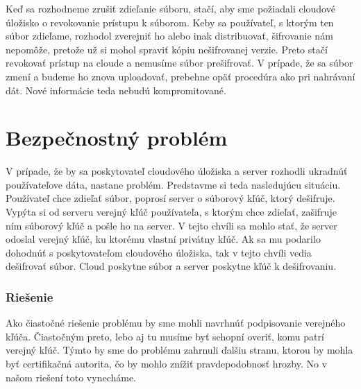 		Keď sa rozhodneme zrušiť zdieľanie súboru, stačí, aby sme požiadali cloudové úložisko o revokovanie prístupu k súborom. Keby sa používateľ, s ktorým ten súbor zdieľame, rozhodol zverejniť ho alebo inak distribuovať, šifrovanie nám nepomôže, pretože už si mohol spraviť kópiu nešifrovanej verzie. Preto stačí revokovať prístup na cloude a nemusíme súbor prešifrovať. V prípade, že sa súbor zmení a budeme ho znova uploadovať, prebehne opäť procedúra ako pri nahrávaní dát. Nové informácie teda nebudú kompromitované.
		
		
	\section{Bezpečnostný problém}
	
		V prípade, že by sa poskytovateľ cloudového úložiska a server rozhodli ukradnúť používateľove dáta, nastane problém. Predstavme si teda nasledujúcu situáciu. Používateľ chce zdieľať súbor, poprosí server o súborový kľúč, ktorý dešifruje. Vypýta si od serveru verejný kľúč používateľa, s ktorým chce zdieľať, zašifruje ním súborový kľúč a pošle ho na server. V tejto chvíli sa mohlo stať, že server odoslal verejný kľúč, ku ktorému vlastní privátny kľúč. Ak sa mu podarilo dohodnúť s poskytovateľom cloudového úložiska, tak v tejto chvíli vedia dešifrovať súbor. Cloud poskytne súbor a server poskytne kľúč k dešifrovaniu.
		
		\subsubsection{Riešenie}
		
		Ako čiastočné riešenie problému by sme mohli navrhnúť podpisovanie verejného kľúča. Čiastočným preto, lebo aj tu musíme byť schopní overiť, komu patrí verejný kľúč. Týmto by sme do problému zahrnuli ďalšiu stranu, ktorou by mohla byť certifikačná autorita, čo by mohlo znížiť pravdepodobnosť hrozby. No v našom riešení toto vynecháme.
		
		
		